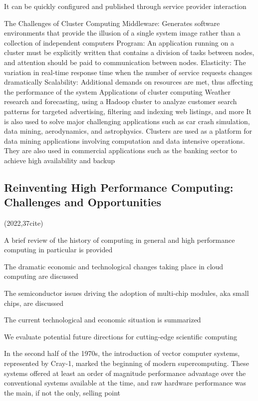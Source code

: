 \documentclass[a4paper,twoside]{scrbook}
\begin{document}
It can be quickly configured and published through service provider interaction
\par
The Challenges of Cluster Computing
Middleware: Generates software environments that provide the illusion of a single system image rather than a collection of independent computers
Program: An application running on a cluster must be explicitly written that contains a division of tasks between nodes, and attention should be paid to communication between nodes.
Elasticity: The variation in real-time response time when the number of service requests changes dramatically
Scalability: Additional demands on resources are met, thus affecting the performance of the system
Applications of cluster computing
Weather research and forecasting, using a Hadoop cluster to analyze customer search patterns for targeted advertising, filtering and indexing web listings, and more
It is also used to solve major challenging applications such as car crash simulation, data mining, aerodynamics, and astrophysics.
Clusters are used as a platform for data mining applications involving computation and data intensive operations. They are also used in commercial applications such as the banking sector to achieve high availability and backup
\subsection{Reinventing High Performance Computing: Challenges and Opportunities\cite{reed2022reinventing}}
(2022,37cite)\par

A brief review of the history of computing in general and high performance computing in particular is provided

The dramatic economic and technological changes taking place in cloud computing are discussed

The semiconductor issues driving the adoption of multi-chip modules, aka small chips, are discussed

The current technological and economic situation is summarized

We evaluate potential future directions for cutting-edge scientific computing

In the second half of the 1970s, the introduction of vector computer systems, represented by Cray-1, marked the beginning of modern supercomputing. These systems offered at least an order of magnitude performance advantage over the conventional systems available at the time, and raw hardware performance was the main, if not the only, selling point
\end{document}
